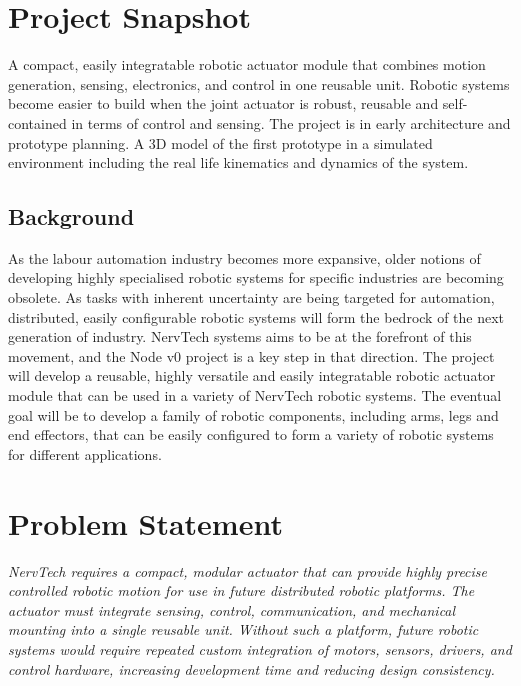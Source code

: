 \documentclass[public]{../../classes/nervtech-overview}
\begin{document}
\maketitle
\tableofcontents
\newpage

\section{Project Snapshot}

\projectsnapshot
{A compact, easily integratable robotic actuator module that combines motion generation, sensing, electronics, and control in one reusable unit.}
{Robotic systems become easier to build when the joint actuator is robust, reusable and self-contained in terms of control and sensing.}
{The project is in early architecture and prototype planning.}
{A 3D model of the first prototype in a simulated environment including the real life kinematics and dynamics of the system.}

\subsection*{Background}
As the labour automation industry becomes more expansive, older notions of developing
highly specialised robotic systems for specific industries are becoming obsolete.
As tasks with inherent uncertainty are being targeted for automation, distributed,
easily configurable robotic systems will form the bedrock of the next generation of
industry.
NervTech systems aims to be at the forefront of this movement, and the Node v0 project
is a key step in that direction.
The project will develop a reusable, highly versatile and easily integratable robotic
actuator module that can be used in a variety of NervTech robotic systems.
The eventual goal will be to develop a family of robotic components, including arms,
legs and end effectors, that can be easily configured to form a variety of robotic
systems for different applications.

\section{Problem Statement}
\textit{NervTech requires a compact, modular actuator that can provide highly precise controlled robotic motion for use in future distributed robotic platforms.
  The actuator must integrate sensing, control, communication, and mechanical mounting into a single reusable unit.
  Without such a platform, future robotic systems would require repeated custom integration of motors, sensors, drivers, and control hardware, increasing development time and reducing design consistency.}
\end{document}
